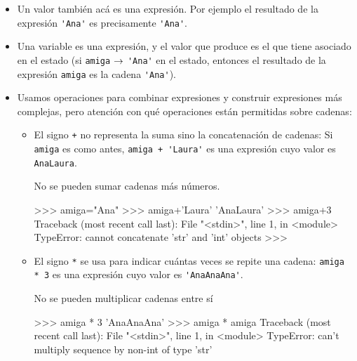 \begin{itemize}
\item Un valor también acá es una expresión. Por ejemplo el
resultado de la expresión \lstinline!'Ana'! es precisamente
\lstinline!'Ana'!.

\item Una variable es una expresión, y el valor que produce es el
que tiene asociado en el estado (si \lstinline!amiga! $\rightarrow$ 
\lstinline!'Ana'! en el estado, entonces el resultado de la
expresión \lstinline!amiga! es la cadena \lstinline!'Ana'!).

\item Usamos operaciones para combinar expresiones y construir
expresiones más complejas, pero atención con qué operaciones están
permitidas sobre cadenas:

\begin{itemize}
\item El signo \lstinline!+! no representa la suma sino la concatenación
de cadenas: Si \lstinline!amiga! es como antes, \lstinline!amiga + 'Laura'! 
es una expresión cuyo valor es \lstinline!AnaLaura!.

\begin{atencion}
No se pueden sumar cadenas más números.
\begin{codigo-python-sn}
>>> amiga="Ana"
>>> amiga+'Laura'
'AnaLaura'
>>> amiga+3
Traceback (most recent call last):
  File "<stdin>", line 1, in <module>
TypeError: cannot concatenate 'str' and 'int' objects
>>>
\end{codigo-python-sn}
\end{atencion}

\item El signo \lstinline!*! se usa para indicar cuántas veces se repite
una cadena: \lstinline!amiga * 3! es una expresión cuyo valor es 
\lstinline!'AnaAnaAna'!.

\begin{atencion}
No se pueden multiplicar cadenas entre sí

\begin{codigo-python-sn}
>>> amiga * 3
'AnaAnaAna'
>>> amiga * amiga
Traceback (most recent call last):
  File "<stdin>", line 1, in <module>
TypeError: can't multiply sequence by non-int of type 'str'
\end{codigo-python-sn}
\end{atencion}

\end{itemize}

\end{itemize}

